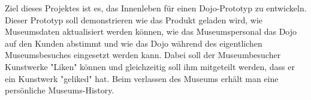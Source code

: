 Ziel dieses Projektes ist es, das Innenleben für einen Dojo-Prototyp zu entwickeln. Dieser Prototyp soll demonstrieren wie das Produkt geladen wird, wie Museumsdaten aktualisiert werden können, wie das Museumspersonal das Dojo auf den Kunden abstimmt und wie das Dojo während des eigentlichen Museumsbesuches eingesetzt werden kann. Dabei soll der Museumbesucher Kunstwerke "Liken" können und gleichzeitig soll ihm mitgeteilt werden, dass er ein Kunstwerk "geliked" hat.
Beim verlassen des Museums erhält man eine persönliche Museums-History.

